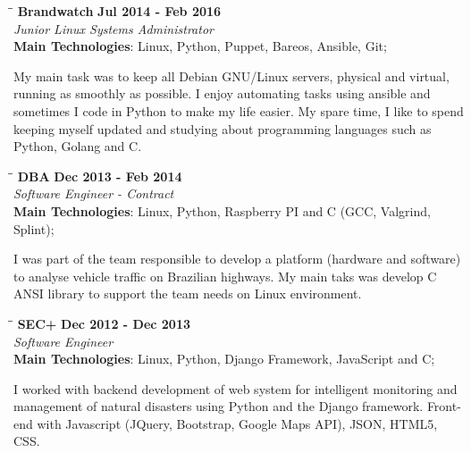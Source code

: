 \documentclass[margin]{res}
\begin{document}
\begin{resume}
\vspace{-0.1in}
   \begin{tabbing}
   \hspace{2.3in}\= \hspace{1.7in}\= \kill %
    \textbf{Brandwatch}    \>\>\textbf{Jul 2014 - Feb 2016}\\
    \textit{Junior Linux Systems Administrator}\\        
    \textbf{Main Technologies}: Linux, Python, Puppet, Bareos, Ansible, Git;
   \end{tabbing}\vspace{-20pt}      %
    \vspace{2mm}
My main task was to keep all Debian GNU/Linux servers, physical and virtual, running as smoothly as possible.
I enjoy automating tasks using ansible and sometimes I code in Python to make my life easier.
My spare time, I like to spend keeping myself updated and studying about programming languages such as Python, Golang and C.


\vspace{-0.1in}
   \begin{tabbing}
   \hspace{2.3in}\= \hspace{1.7in}\= \kill %
    \textbf{DBA}    \>\>\textbf{Dec 2013 - Feb 2014}\\
    \textit{Software Engineer - Contract}\\        
    \textbf{Main Technologies}: Linux, Python, Raspberry PI and C (GCC, Valgrind, Splint);
   \end{tabbing}\vspace{-20pt}      %
    \vspace{2mm}
I was part of the team responsible to develop a platform (hardware and software) to analyse vehicle
traffic on Brazilian highways. My main taks was develop C ANSI library to support the team needs on Linux
environment.

\vspace{-0.1in}
   \begin{tabbing}
   \hspace{2.3in}\= \hspace{1.7in}\= \kill %
    \textbf{SEC+}    \>\>\textbf{Dec 2012 - Dec 2013}\\
    \textit{Software Engineer}\\        
    \textbf{Main Technologies}: Linux, Python, Django Framework, JavaScript and C;
   \end{tabbing}\vspace{-20pt}      %
    \vspace{2mm}
     I worked with backend development of web system for intelligent monitoring 
     and management of natural disasters using Python and the Django framework. 
     Front-end with Javascript (JQuery, Bootstrap, Google Maps API),
     JSON, HTML5, CSS.


\end{resume}
\end{document}
